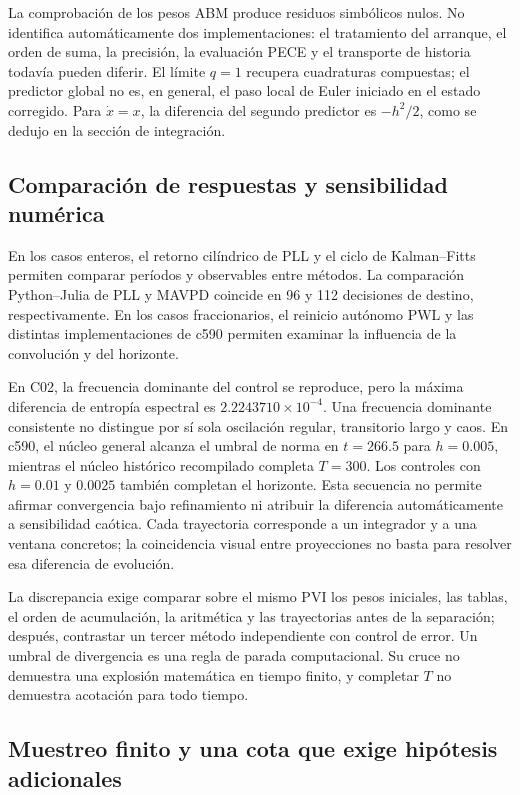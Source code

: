 La comprobación de los pesos ABM produce residuos simbólicos nulos. No
identifica automáticamente dos implementaciones: el tratamiento del arranque,
el orden de suma, la precisión, la evaluación PECE y el transporte de historia
todavía pueden diferir. El límite $q=1$ recupera cuadraturas compuestas;
el predictor global no es, en general, el paso local de Euler iniciado en el
estado corregido. Para $\dot x=x$, la diferencia del segundo predictor es
$-h^2/2$, como se dedujo en la sección de integración.

\subsection{Comparación de respuestas y sensibilidad numérica}

En los casos enteros, el retorno cilíndrico de PLL y el ciclo de
Kalman--Fitts permiten comparar períodos y observables entre métodos.
La comparación Python--Julia de PLL y MAVPD coincide en 96 y 112
decisiones de destino, respectivamente. En los casos fraccionarios,
el reinicio autónomo PWL y las distintas implementaciones de c590
permiten examinar la influencia de la convolución y del horizonte.

En C02, la frecuencia dominante del control se reproduce, pero la máxima
diferencia de entropía espectral es $2.2243710\times10^{-4}$. Una frecuencia
dominante consistente no distingue por sí sola oscilación regular, transitorio
largo y caos. En c590, el núcleo general alcanza el umbral de norma en
$t=266.5$ para $h=0.005$, mientras el núcleo histórico recompilado completa
$T=300$. Los controles con $h=0.01$ y $0.0025$ también completan el horizonte.
Esta secuencia no permite afirmar convergencia bajo refinamiento ni atribuir
la diferencia automáticamente a sensibilidad caótica. Cada trayectoria corresponde a un integrador y a una ventana
concretos; la coincidencia visual entre proyecciones no basta para
resolver esa diferencia de evolución.

La discrepancia exige comparar sobre el mismo PVI los
pesos iniciales, las tablas, el orden de acumulación, la aritmética y las
trayectorias antes de la separación; después, contrastar un tercer método
independiente con control de error. Un umbral de divergencia es una regla de
parada computacional. Su cruce no demuestra una explosión matemática en
tiempo finito, y completar $T$ no demuestra acotación para todo tiempo.

\subsection{Muestreo finito y una cota que exige hipótesis adicionales}

